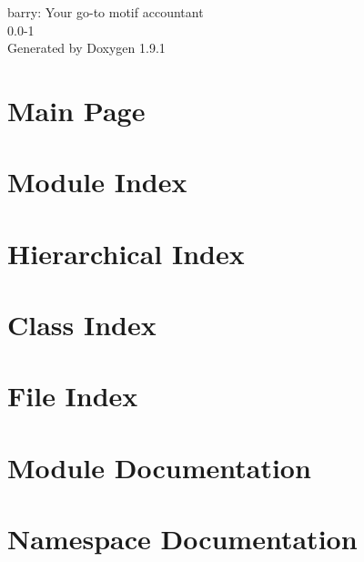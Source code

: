 \let\mypdfximage\pdfximage\def\pdfximage{\immediate\mypdfximage}\documentclass[twoside]{book}
\newcommand{\+}{\discretionary{\mbox{\scriptsize$\hookleftarrow$}}{}{}}
\newcommand{\clearemptydoublepage}{%
  \newpage{\pagestyle{empty}\cleardoublepage}%
}
\begin{document}
\raggedbottom

\hypersetup{pageanchor=false,
             bookmarksnumbered=true,
             pdfencoding=unicode
            }
\begin{titlepage}
\vspace*{7cm}
\begin{center}%
{\Large barry\+: Your go-\/to motif accountant \\[1ex]\large 0.\+0-\/1 }\\
\vspace*{1cm}
{\large Generated by Doxygen 1.9.1}\\
\end{center}
\end{titlepage}
\clearemptydoublepage
{}
\tableofcontents
\clearemptydoublepage
{}
\hypersetup{pageanchor=true}

\chapter{Main Page}
\label{index}\hypertarget{index}{}
\chapter{Module Index}

\chapter{Hierarchical Index}

\chapter{Class Index}

\chapter{File Index}

\chapter{Module Documentation}





\chapter{Namespace Documentation}







\end{document}
